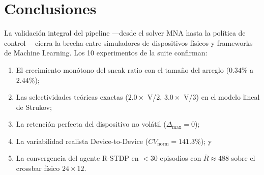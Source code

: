 \documentclass[12pt,a4paper]{article}
\begin{document}
\section{Conclusiones}
La validación integral del pipeline ---desde el solver MNA hasta la política de control--- cierra la brecha entre simuladores de dispositivos físicos y frameworks de Machine Learning. Los 10 experimentos de la suite confirman:
\begin{enumerate}
    \item El crecimiento monótono del sneak ratio con el tamaño del arreglo ($0.34\%$ a $2.44\%$);
    \item Las selectividades teóricas exactas ($2.0\times$ V/2, $3.0\times$ V/3) en el modelo lineal de Strukov;
    \item La retención perfecta del dispositivo no volátil ($\Delta_{\max} = 0$);
    \item La variabilidad realista Device-to-Device ($CV_{\text{norm}} = 141.3\%$); y
    \item La convergencia del agente R-STDP en $<30$ episodios con $\bar{R} \approx 488$ sobre el crossbar físico $24 \times 12$.
\end{enumerate}
\end{document}
